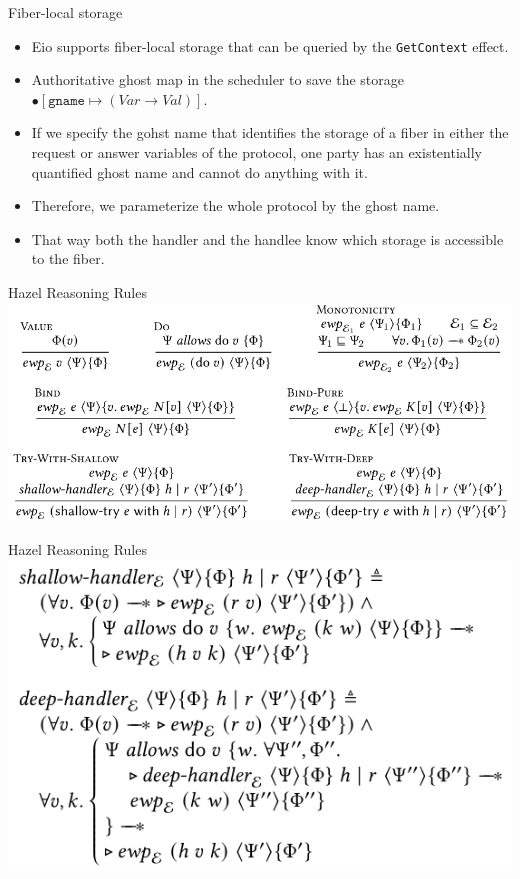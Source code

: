 \documentclass[aspectratio=43]{beamer}
\begin{document}
\begin{frame}{Fiber-local storage}
    \begin{itemize}
        \item Eio supports fiber-local storage that can be queried by the \texttt{GetContext} effect.
        \item Authoritative ghost map in the scheduler to save the storage \(\bullet [\texttt{gname} \mapsto (\textit{Var} \to \textit{Val})]\).
        \item If we specify the gohst name that identifies the storage of a fiber in either the request or answer variables of the protocol, one party has an existentially quantified ghost name and cannot do anything with it.
        \item Therefore, we parameterize the whole protocol by the ghost name.
        \item That way both the handler and the handlee know which storage is accessible to the fiber.
    \end{itemize}
\end{frame}

\begin{frame}{Hazel Reasoning Rules}
    \includegraphics[width=\textwidth]{reasoning_rules1.png}
\end{frame}

\begin{frame}{Hazel Reasoning Rules}
    \includegraphics[width=\textwidth]{reasoning_rules2.png}
\end{frame}
\end{document}
